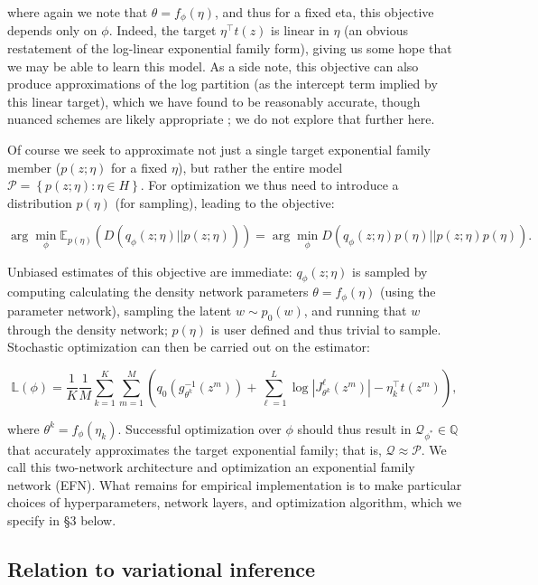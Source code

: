 \documentclass{article}
\begin{document}
where again we note that $\theta = f_\phi(\eta)$, and thus for a fixed eta, this objective depends only on $\phi$.  Indeed, the target $\eta^\top t(z)$ is linear in $\eta$ (an obvious restatement of the log-linear exponential family form), giving us some hope that we may be able to learn this model.  As a side note, this objective can also produce approximations of the log partition (as the intercept term implied by this linear target), which we have found to be reasonably accurate, though nuanced schemes are likely appropriate \cite{papamakarios2015distilling}; we do not explore that further here.

Of course we seek to approximate not just a single target exponential family member ($p(z;\eta)$ for a fixed $\eta$), but rather the entire model $\mathcal{P} = \left\{p(z;\eta): \eta \in H\right\}$.   For optimization we thus need to introduce a distribution $p(\eta)$ (for sampling), leading to the objective: 

$$\arg\!\min_{\!\!\!\!\!\!\!\!\!\!\!\phi} \mathbb{E}_{p(\eta)} \left( D\left( q_\phi(z;\eta) || p(z;\eta) \right)\right) =  \arg\!\min_{\!\!\!\!\!\!\!\!\!\!\!\phi}  D\left( q_\phi(z;\eta)p(\eta) || p(z;\eta)p(\eta) \right).$$

Unbiased estimates of this objective are immediate: $q_\phi(z;\eta)$ is sampled by computing calculating the density network parameters $\theta = f_\phi(\eta)$ (using the parameter network), sampling the latent $w \sim p_0(w)$, and running that $w$ through the density network; $p(\eta)$ is user defined and thus trivial to sample.  Stochastic optimization can then be carried out on the estimator:   

$$\mathbb{L}(\phi) = \frac{1}{K}\frac{1}{M}\sum_{k=1}^K \sum_{m=1}^M \left( q_0\left( g_{\theta^k}^{-1}\left(z^m\right)\right) + \sum_{\ell=1}^L  \log | J^\ell_{\theta^k}\left(z^m\right) | - \eta_k^\top t\left(z^m\right) \right),$$

where $\theta^k = f_\phi\left(\eta_k\right)$.  Successful optimization over $\phi$ should thus result in $\mathcal{Q}_{\phi^*} \in \mathbb{Q}$ that accurately approximates the target exponential family; that is, $\mathcal{Q} \approx \mathcal{P}$.  We call this two-network architecture and optimization an exponential family network (EFN).   What remains for empirical implementation is to make particular choices of hyperparameters, network layers, and optimization algorithm, which we specify in \S3 below.


 \subsection{Relation to variational inference}
 
\end{document}
